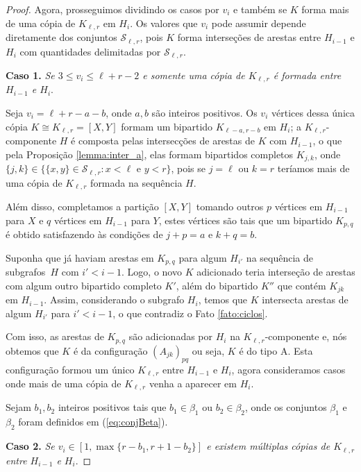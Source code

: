\documentclass[12pt,a4paper]{book}
\newcommand{\K}{K_{\ell,r}} %
\newcommand{\Slr}{\mathcal{S}_{\ell,r}} %
\begin{document}
\begin{proof}
    Agora, prosseguimos dividindo os casos por $v_i$ e também se $K$ forma mais de uma cópia de $\K$ em $H_i$. 
    Os valores que $v_i$ pode assumir depende diretamente dos conjuntos $\Slr$, pois $K$ forma interseções de arestas entre $H_{i-1}$ e $H_i$ com quantidades delimitadas por $\Slr$.
    
    \medskip \textbf{Caso 1.}
	\emph{Se $3 \leq v_i \leq \ell+r-2$ e somente uma cópia de $\K$ é formada entre $H_{i-1}$ e $H_i$}.
       
    Seja $v_i= \ell+r-a-b$, onde $a,b$ são inteiros positivos.  
    Os $v_i$ vértices dessa única cópia $K \cong \K= [X,Y]$ formam um bipartido $K_{\ell-a,r-b}$ em $H_i$; 
    a $\K$-componente $H$ é composta pelas intersecções de arestas de $K$ com $H_{i-1}$, 
    o que pela Proposição \ref{lemma:inter_a}, elas formam bipartidos completos $K_{j,k}$,
    onde $\{j,k\} \in \{\{x,y\} \in \Slr: x < \ell \text{ e } y < r\}$, pois se $j=\ell$ ou $k=r$ teríamos mais de uma cópia de $\K$ formada na sequência $H$.  
   
   Além disso, completamos a partição $[X,Y]$ tomando outros $p$ vértices em $H_{i-1}$ para $X$ e $q$ vértices em $H_{i-1}$ para $Y$, estes vértices são tais que um bipartido $K_{p,q}$ é obtido satisfazendo às condições de  $j+p = a$ e $k+q = b$. 
   
   Suponha que já haviam arestas em $K_{p,q}$  para algum $H_{i'}$ na sequência de subgrafos~$H$ com $i' < i-1$.
   Logo, o novo $K$ adicionado teria interseção de arestas com algum outro bipartido completo $K'$, além do bipartido $K''$ que contém $K_{jk}$ em $H_{i-1}$.
   Assim, considerando o subgrafo $H_{i}$,
   temos que $K$ 
   intersecta arestas de algum $H_{i'}$ para $i'<i-1$, o que contradiz o Fato \ref{fato:ciclos}.
  
     Com isso, as arestas de $K_{p,q}$ são adicionadas por $H_i$ na $\K$-componente e, nós obtemos que $K$ é da configuração %
     \hyperlink{HconfigA}{$(A_{jk})_{pq}$}
     ou seja, $K$ é do tipo A.  
    Esta configuração formou um único $\K$ entre $H_{i-1}$ e $H_i$, agora consideramos casos onde mais de uma cópia de $\K$ venha a aparecer em $H_i$.

    Sejam $b_1, b_2$ inteiros positivos tais que $b_1 \in \beta_1$ ou $b_2 \in \beta_2$, onde os conjuntos $\beta_1$ e $\beta_2$ foram definidos em (\ref{eq:conjBeta}).
    
     \medskip \textbf{Caso 2.} 
   \emph{Se $v_i \in \left[1, \max\{r - b_1, r+1-b_2\}\right]$ e existem múltiplas cópias de $\K$ entre $H_{i-1}$ e $H_i$}.


\end{proof}
\end{document}
